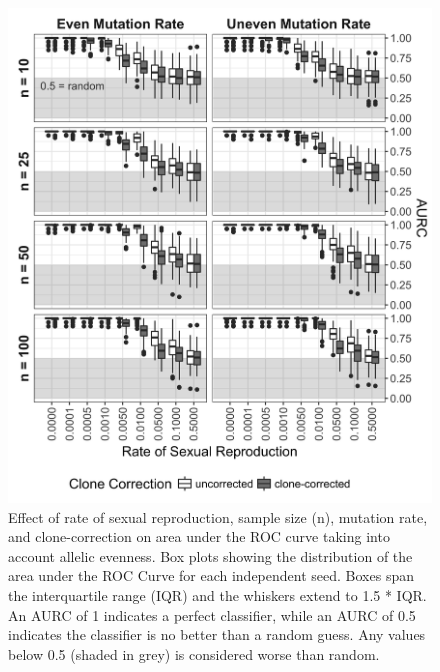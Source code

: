 \documentclass[double,11pt]{beavtex}
\begin{document}
  \begin{figure}
  
  {\centering \includegraphics[width=0.8\linewidth]{figure/simulations/AURC_box_plot_ea} 
  
  }
  
  \caption[Effect of rate of sexual reproduction, sample size, mutation rate,
  and clone-correction on area under the ROC curve taking into account allelic
  evenness.]{Effect of rate of sexual reproduction, sample size (n), mutation rate,
  and clone-correction on area under the ROC curve taking into account allelic
  evenness. Box plots showing the distribution of the area under the ROC Curve for
  each independent seed. Boxes span the interquartile range (IQR) and the whiskers
  extend to 1.5 * IQR. An AURC of 1 indicates a perfect classifier, while an AURC
  of 0.5 indicates the classifier is no better than a random guess. Any values
  below 0.5 (shaded in grey) is considered worse than random.}\label{fig:sim2a}
  \end{figure}
  
\end{document}
